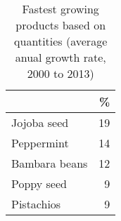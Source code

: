 \begin{table}
\centering
\caption{Fastest growing products based on quantities (average anual growth rate, 2000 to 2013)} 
{\footnotesize
\begin{tabular}{p{2.2cm}r}
  \toprule
 & \% \\ 
  \midrule
Jojoba seed & 19 \\ 
  Peppermint & 14 \\ 
  Bambara beans & 12 \\ 
  Poppy seed & 9 \\ 
  Pistachios & 9 \\ 
   \bottomrule
\end{tabular}
}
\end{table}
